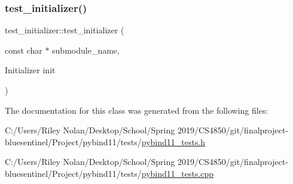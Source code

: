 \subsubsection{\texorpdfstring{test\_initializer()}{test\_initializer()}\hspace{0.1cm}{\footnotesize\ttfamily [2/2]}}
{\footnotesize\ttfamily test\+\_\+initializer\+::test\+\_\+initializer (\begin{DoxyParamCaption}\item[{const char $\ast$}]{submodule\+\_\+name,  }\item[{Initializer}]{init }\end{DoxyParamCaption})}



The documentation for this class was generated from the following files\+:\begin{DoxyCompactItemize}
\item 
C\+:/\+Users/\+Riley Nolan/\+Desktop/\+School/\+Spring 2019/\+C\+S4850/git/finalproject-\/bluesentinel/\+Project/pybind11/tests/\mbox{\hyperlink{pybind11__tests_8h}{pybind11\+\_\+tests.\+h}}\item 
C\+:/\+Users/\+Riley Nolan/\+Desktop/\+School/\+Spring 2019/\+C\+S4850/git/finalproject-\/bluesentinel/\+Project/pybind11/tests/\mbox{\hyperlink{pybind11__tests_8cpp}{pybind11\+\_\+tests.\+cpp}}\end{DoxyCompactItemize}
